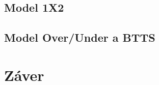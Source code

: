\documentclass[10pt,twoside,slovak,a4paper]{article}
\begin{document}
\subsection{Model 1X2}


\subsection{Model Over/Under a BTTS}


\section{Záver} \label{zaver}




\end{document}
